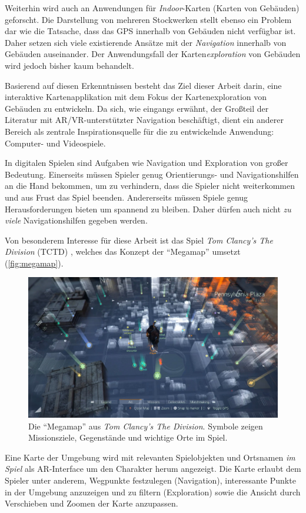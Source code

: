 Weiterhin wird auch an Anwendungen für \emph{Indoor}-Karten (Karten von Gebäuden) geforscht.
Die Darstellung von mehreren Stockwerken stellt ebenso ein Problem dar wie die Tatsache, dass das GPS innerhalb von Gebäuden nicht verfügbar ist.
Daher setzen sich viele existierende Ansätze mit der \emph{Navigation} innerhalb von Gebäuden auseinander.
Der Anwendungsfall der Karten\emph{exploration} von Gebäuden wird jedoch bisher kaum behandelt.

Basierend auf diesen Erkenntnissen besteht das Ziel dieser Arbeit darin, eine interaktive Kartenapplikation mit dem Fokus der Kartenexploration von Gebäuden zu entwickeln.
Da sich, wie eingangs erwähnt, der Großteil der Literatur mit AR/VR-unterstützter Navigation beschäftigt, dient ein anderer Bereich als zentrale Inspirationsquelle für die zu entwickelnde Anwendung: Computer- und Videospiele.

In digitalen Spielen sind Aufgaben wie Navigation und Exploration von großer Bedeutung.
Einerseits müssen Spieler genug Orien\-tie\-rungs- und Navigationshilfen an die Hand bekommen, um zu verhindern, dass die Spieler nicht weiterkommen und aus Frust das Spiel beenden.
Andererseits müssen Spiele genug Herausforderungen bieten um spannend zu bleiben.
Daher dürfen auch nicht \emph{zu viele} Navigationshilfen gegeben werden.

Von besonderem Interesse für diese Arbeit ist das Spiel \emph{Tom Clancy's The Division} (TCTD) \parencite{Ubisoft2018}, welches das Konzept der \enquote{Megamap} umsetzt (\autoref{fig:megamap}).
\begin{figure}
    \centering
    \includegraphics[width=\textwidth]{figures/the_division_megamap.jpg}
    \caption{Die \enquote{Megamap} aus \emph{Tom Clancy's The Division}. Symbole zeigen Missionsziele, Gegenstände und wichtige Orte im Spiel.}
    \label{fig:megamap}
\end{figure}
Eine Karte der Umgebung wird mit relevanten Spielobjekten und Ortsnamen \emph{im Spiel} als AR-Interface um den Charakter herum angezeigt.
Die Karte erlaubt dem Spieler unter anderem, Wegpunkte festzulegen (Navigation), interessante Punkte in der Umgebung anzuzeigen und zu filtern (Exploration) sowie die Ansicht durch Verschieben und Zoomen der Karte anzupassen.

